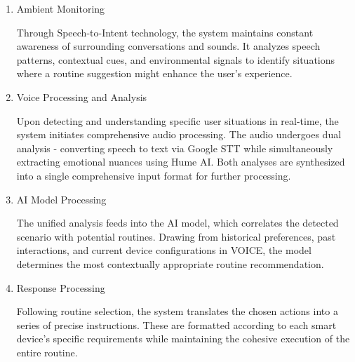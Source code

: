\documentclass[conference]{IEEEtran}
\begin{document}
\begin{enumerate}[label=\arabic*]
    \begin{enumerate}[label=\arabic*)]
        \item Ambient Monitoring\par
        \vspace{0.3em}
        Through Speech-to-Intent technology, the system maintains constant awareness of surrounding conversations and sounds. It analyzes speech patterns, contextual cues, and environmental signals to identify situations where a routine suggestion might enhance the user's experience.

        \vspace{0.5em}

        \item Voice Processing and Analysis\par
        \vspace{0.3em}
        Upon detecting and understanding specific user situations in real-time, the system initiates comprehensive audio processing. The audio undergoes dual analysis - converting speech to text via Google STT while simultaneously extracting emotional nuances using Hume AI. Both analyses are synthesized into a single comprehensive input format for further processing.

        \vspace{0.5em}

        \item AI Model Processing\par
        \vspace{0.3em}
        The unified analysis feeds into the AI model, which correlates the detected scenario with potential routines. Drawing from historical preferences, past interactions, and current device configurations in VOICE, the model determines the most contextually appropriate routine recommendation.

        \vspace{0.5em}

        \item Response Processing\par
        \vspace{0.3em}
        Following routine selection, the system translates the chosen actions into a series of precise instructions. These are formatted according to each smart device's specific requirements while maintaining the cohesive execution of the entire routine.

        \vspace{0.5em}


\end{enumerate}
\end{enumerate}
\end{document}

